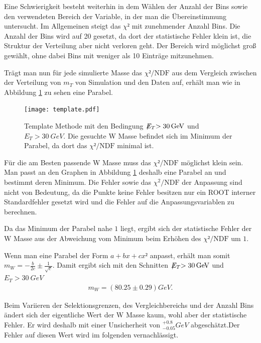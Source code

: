 \documentclass[a4paper,12pt]{article}
\newcommand{\met}{\ensuremath{\not\mathrel{E}}_T}
\begin{document}
Eine Schwierigkeit besteht weiterhin in dem Wählen der Anzahl der Bins sowie den verwendeten
Bereich der Variable, in der man die Übereinstimmung untersucht. Im Allgemeinen steigt das $χ²$ mit zunehmender Anzahl Bins. Die Anzahl der Bins wird auf
20 gesetzt, da dort der statistische Fehler klein ist, die Struktur der Verteilung aber nicht
verloren geht. Der Bereich wird möglichst groß gewählt, ohne dabei Bins mit weniger als 10 Einträge
mitzunehmen.

Trägt man nun für jede simulierte Masse das $χ²/\text{NDF}$ aus dem Vergleich zwischen der
Verteilung von $m_T$ von
Simulation und den Daten auf, erhält man wie in Abbildung \ref{fig:template} zu sehen eine Parabel.

\begin{figure}[htb]
	\centering
	\texttt{[image: template.pdf]}
	\caption{Template Methode mit den Bedingung $\met > \SI{30}{GeV}$ und $E_{T} > \SI{30}{GeV}$. Die gesuchte W Masse befindet sich im Minimum der Parabel, da dort
		das $χ²/\text{NDF}$ minimal ist.}
	\label{fig:template}
\end{figure}

Für die am Besten passende W Masse muss das $χ²/\text{NDF}$ möglichst klein sein. Man passt an den
Graphen in Abbildung \ref{fig:template} deshalb eine Parabel an und bestimmt deren Minimum. Die
Fehler sowie das $χ^2/\text{NDF}$ der Anpassung sind nicht von Bedeutung, da die Punkte keine
Fehler besitzen nur ein ROOT interner Standardfehler gesetzt wird und die Fehler auf die
Anpassungsvariablen zu berechnen.

Da das Minimum der Parabel nahe $1$ liegt, ergibt sich der statistische Fehler der W Masse aus der Abweichung vom Minimum beim Erhöhen des
$χ²/\text{NDF}$ um $1$.

Wenn man eine Parabel der Form $a + bx + cx²$ anpasst, erhält man somit $m_W = -\frac{b}{2c} ±
\frac{1}{\sqrt{c}}$.
Damit ergibt sich mit den Schnitten $\met > \SI{30}{GeV}$ und $E_{T} > \SI{30}{GeV}$
\begin{align*}
	m_W =  ( 80.25 ± 0.29  ) \si{GeV}.
\end{align*}

Beim Variieren der Selektionsgrenzen, des Vergleichbereichs und der Anzahl Bins ändert sich der
eigentliche Wert der W Masse kaum, wohl aber der statistische Fehler. Er wird deshalb mit einer
Unsicherheit von $^{+0.8}_{-0.05}\si{GeV}$ abgeschätzt.Der Fehler auf diesen Wert wird im folgenden
vernachlässigt.
\end{document}
